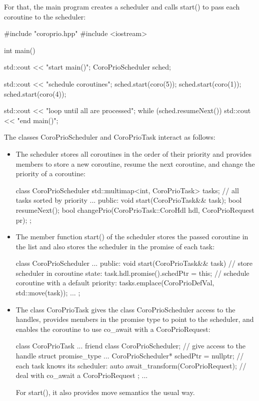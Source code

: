 For that, the main program creates a scheduler and calls start() to pass each coroutine to the scheduler:


\begin{cpp}
#include "coroprio.hpp"
#include <iostream>

int main()
{
	std::cout << "start main()\n";
	CoroPrioScheduler sched;
	
	std::cout << "schedule coroutines\n";
	sched.start(coro(5));
	sched.start(coro(1));
	sched.start(coro(4));
	
	std::cout << "loop until all are processed\n";
	while (sched.resumeNext()) {
	}
	std::cout << "end main()\n";
}
\end{cpp}

The classes CoroPrioScheduler and CoroPrioTask interact as follows:

\begin{itemize}
\item 
The scheduler stores all coroutines in the order of their priority and provides members to store a new coroutine, resume the next coroutine, and change the priority of a coroutine:

\begin{cpp}
class CoroPrioScheduler
{
	std::multimap<int, CoroPrioTask> tasks; // all tasks sorted by priority
	...
	public:
	void start(CoroPrioTask&& task);
	bool resumeNext();
	bool changePrio(CoroPrioTask::CoroHdl hdl, CoroPrioRequest pr);
};
\end{cpp}

\item 
The member function start() of the scheduler stores the passed coroutine in the list and also stores the scheduler in the promise of each task:

\begin{cpp}
class CoroPrioScheduler
{
	...
	public:
	void start(CoroPrioTask&& task) {
		// store scheduler in coroutine state:
		task.hdl.promise().schedPtr = this;
		// schedule coroutine with a default priority:
		tasks.emplace(CoroPrioDefVal, std::move(task));
	}
	...
};
\end{cpp}

\item 
The class CoroPrioTask gives the class CoroPrioScheduler access to the handles, provides members in the promise type to point to the scheduler, and enables the coroutine to use co\_await with a CoroPrioRequest:

\begin{cpp}
class CoroPrioTask {
	...
	friend class CoroPrioScheduler; // give access to the handle
	struct promise_type {
		...
		CoroPrioScheduler* schedPtr = nullptr; // each task knows its scheduler:
		auto await_transform(CoroPrioRequest); // deal with co_await a CoroPrioRequest
	};
	...
}
\end{cpp}

For start(), it also provides move semantics the usual way.

\end{itemize}

